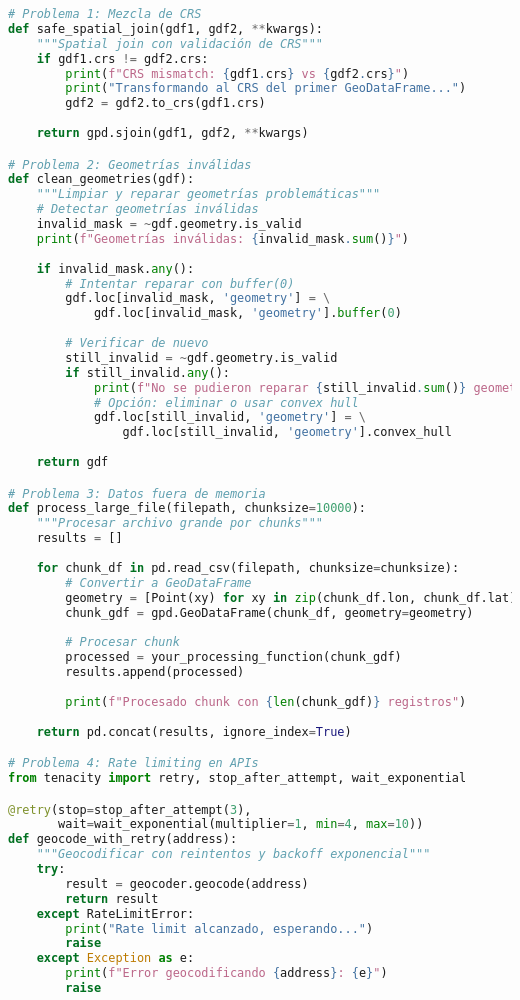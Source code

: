 \documentclass[11pt,a4paper]{article}
\begin{document}
\begin{lstlisting}[language=Python]
# Problema 1: Mezcla de CRS
def safe_spatial_join(gdf1, gdf2, **kwargs):
    """Spatial join con validación de CRS"""
    if gdf1.crs != gdf2.crs:
        print(f"CRS mismatch: {gdf1.crs} vs {gdf2.crs}")
        print("Transformando al CRS del primer GeoDataFrame...")
        gdf2 = gdf2.to_crs(gdf1.crs)
    
    return gpd.sjoin(gdf1, gdf2, **kwargs)

# Problema 2: Geometrías inválidas
def clean_geometries(gdf):
    """Limpiar y reparar geometrías problemáticas"""
    # Detectar geometrías inválidas
    invalid_mask = ~gdf.geometry.is_valid
    print(f"Geometrías inválidas: {invalid_mask.sum()}")
    
    if invalid_mask.any():
        # Intentar reparar con buffer(0)
        gdf.loc[invalid_mask, 'geometry'] = \
            gdf.loc[invalid_mask, 'geometry'].buffer(0)
        
        # Verificar de nuevo
        still_invalid = ~gdf.geometry.is_valid
        if still_invalid.any():
            print(f"No se pudieron reparar {still_invalid.sum()} geometrías")
            # Opción: eliminar o usar convex hull
            gdf.loc[still_invalid, 'geometry'] = \
                gdf.loc[still_invalid, 'geometry'].convex_hull
    
    return gdf

# Problema 3: Datos fuera de memoria
def process_large_file(filepath, chunksize=10000):
    """Procesar archivo grande por chunks"""
    results = []
    
    for chunk_df in pd.read_csv(filepath, chunksize=chunksize):
        # Convertir a GeoDataFrame
        geometry = [Point(xy) for xy in zip(chunk_df.lon, chunk_df.lat)]
        chunk_gdf = gpd.GeoDataFrame(chunk_df, geometry=geometry)
        
        # Procesar chunk
        processed = your_processing_function(chunk_gdf)
        results.append(processed)
        
        print(f"Procesado chunk con {len(chunk_gdf)} registros")
    
    return pd.concat(results, ignore_index=True)

# Problema 4: Rate limiting en APIs
from tenacity import retry, stop_after_attempt, wait_exponential

@retry(stop=stop_after_attempt(3), 
       wait=wait_exponential(multiplier=1, min=4, max=10))
def geocode_with_retry(address):
    """Geocodificar con reintentos y backoff exponencial"""
    try:
        result = geocoder.geocode(address)
        return result
    except RateLimitError:
        print("Rate limit alcanzado, esperando...")
        raise
    except Exception as e:
        print(f"Error geocodificando {address}: {e}")
        raise
\end{lstlisting}
\end{document}
